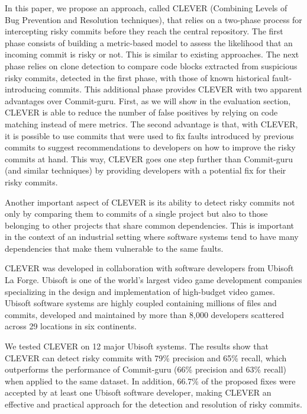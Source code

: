 \documentclass[sigconf]{acmart}
\begin{document}
In this paper, we propose an approach, called CLEVER (Combining Levels
of Bug Prevention and Resolution techniques), that relies on a two-phase
process for intercepting risky commits before they reach the central
repository. The first phase consists of building a metric-based model to
assess the likelihood that an incoming commit is risky or not. This is
similar to existing approaches. The next phase relies on clone detection
to compare code blocks extracted from suspicious risky commits, detected
in the first phase, with those of known historical fault-introducing
commits. This additional phase provides CLEVER with two apparent
advantages over Commit-guru. First, as we will show in the evaluation
section, CLEVER is able to reduce the number of false positives by
relying on code matching instead of mere metrics. The second advantage
is that, with CLEVER, it is possible to use commits that were used to
fix faults introduced by previous commits to suggest recommendations to
developers on how to improve the risky commits at hand. This way, CLEVER
goes one step further than Commit-guru (and similar techniques) by
providing developers with a potential fix for their risky commits.

Another important aspect of CLEVER is its ability to detect risky
commits not only by comparing them to commits of a single project but
also to those belonging to other projects that share common
dependencies. This is important in the context of an industrial setting
where software systems tend to have many dependencies that make them
vulnerable to the same faults.

CLEVER was developed in collaboration with software developers from
Ubisoft La Forge. Ubisoft is one of the world's largest video game
development companies specializing in the design and implementation of
high-budget video games. Ubisoft software systems are highly coupled
containing millions of files and commits, developed and maintained by
more than 8,000 developers scattered across 29 locations in six
continents.

We tested CLEVER on 12 major Ubisoft systems. The results show that
CLEVER can detect risky commits with 79\% precision and 65\% recall,
which outperforms the performance of Commit-guru (66\% precision and
63\% recall) when applied to the same dataset. In addition, 66.7\% of
the proposed fixes were accepted by at least one Ubisoft software
developer, making CLEVER an effective and practical approach for the
detection and resolution of risky commits.
\end{document}
